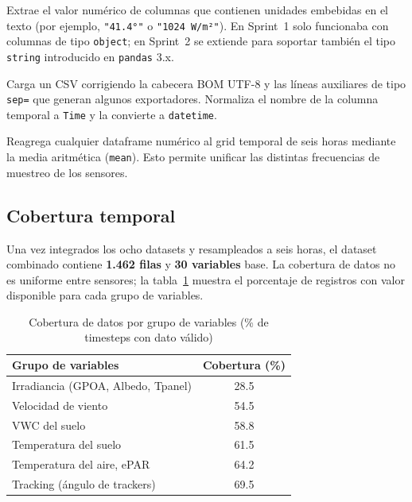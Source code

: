 \documentclass[12pt,a4paper]{article}
\begin{document}
\begin{description}[style=nextline]
    \item[\texttt{strip\_unit(series)}]
        Extrae el valor numérico de columnas que contienen unidades embebidas en el
        texto (por ejemplo, \texttt{"41.4°"} o \texttt{"1024 W/m²"}). En Sprint~1
        solo funcionaba con columnas de tipo \texttt{object}; en Sprint~2 se extiende
        para soportar también el tipo \texttt{string} introducido en \texttt{pandas} 3.x.

    \item[\texttt{load\_csv(filepath)}]
        Carga un CSV corrigiendo la cabecera BOM UTF-8 y las líneas auxiliares de tipo
        \texttt{sep=} que generan algunos exportadores. Normaliza el nombre de la columna
        temporal a \texttt{Time} y la convierte a \texttt{datetime}.

    \item[\texttt{resample\_to\_6h(df)}]
        Reagrega cualquier dataframe numérico al grid temporal de seis horas mediante
        la media aritmética (\texttt{mean}). Esto permite unificar las distintas
        frecuencias de muestreo de los sensores.
\end{description}

\subsection{Cobertura temporal}

Una vez integrados los ocho datasets y resampleados a seis horas, el dataset combinado
contiene \textbf{1.462 filas} y \textbf{30 variables} base. La cobertura de datos no
es uniforme entre sensores; la tabla~\ref{tab:cobertura} muestra el porcentaje de
registros con valor disponible para cada grupo de variables.

\begin{table}[H]
\centering
\caption{Cobertura de datos por grupo de variables (\% de timesteps con dato válido)}
\label{tab:cobertura}
\begin{tabular}{lc}
\toprule
\textbf{Grupo de variables} & \textbf{Cobertura (\%)} \\
\midrule
Irradiancia (GPOA, Albedo, Tpanel)  & 28.5 \\
Velocidad de viento                  & 54.5 \\
VWC del suelo                        & 58.8 \\
Temperatura del suelo                & 61.5 \\
Temperatura del aire, ePAR           & 64.2 \\
Tracking (ángulo de trackers)        & 69.5 \\
\bottomrule
\end{tabular}
\end{table}
\end{document}
